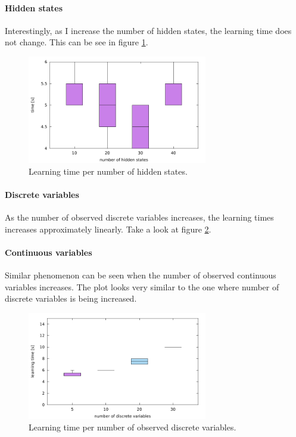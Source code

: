 \documentclass[thesis=B,english]{FITthesis}[2012/06/26]
\begin{document}
\paragraph{Hidden states}

Interestingly, as I increase the number of hidden states, the learning time does not change. This can be see in figure \ref{fig:hidden_states_learning_testing_time}.

\begin{figure}
	\centering
 	\includegraphics[width=0.7\textwidth]{hidden_states_learning_testing_time}
 	\caption{Learning time per number of hidden states.}
 	\label{fig:hidden_states_learning_testing_time}
\end{figure}

\paragraph{Discrete variables}

As the number of observed discrete variables increases, the learning times increases approximately linearly. Take a look at figure \ref{fig:discrete_variables_learning_time}.

\paragraph{Continuous variables}

Similar phenomenon can be seen when the number of observed continuous variables increases. The plot looks very similar to the one where number of discrete variables is being increased.

\begin{figure}
	\centering
 	\includegraphics[width=0.7\textwidth]{discrete_variables_learning_time}
 	\caption{Learning time per number of observed discrete variables.}
 	\label{fig:discrete_variables_learning_time}
\end{figure}
\end{document}
